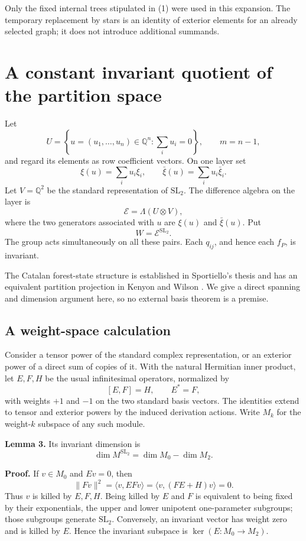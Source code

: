 \documentclass[11pt]{article}
\providecommand{\textquotesingle}{'}
\begin{document}
Only the fixed internal trees stipulated in (1) were used in this expansion. The temporary replacement by stars is an identity of exterior elements for an already selected graph; it does not introduce additional summands.

\section{A constant invariant quotient of the partition space}\label{a-constant-invariant-quotient-of-the-partition-space}

Let \[
U=\left\{u=(u_1,\ldots,u_n)\in\mathbb Q^n:
                  \sum_i u_i=0\right\},\qquad m=n-1,
\] and regard its elements as row coefficient vectors. On one layer set \[
\xi(u)=\sum_i u_i\xi_i,\qquad
\bar\xi(u)=\sum_i u_i\bar\xi_i.
\] Let \(V=\mathbb Q^2\) be the standard representation of \(\mathrm{SL}_2\). The difference algebra on the layer is \[
\mathcal E=\Lambda(U\otimes V),
\] where the two generators associated with \(u\) are \(\xi(u)\) and \(\bar\xi(u)\). Put \[
W=\mathcal E^{\mathrm{SL}_2}.
\tag{8}
\] The group acts simultaneously on all these pairs. Each \(q_{ij}\), and hence each \(f_P\), is invariant.

The Catalan forest-state structure is established in Sportiello\textquotesingle s thesis \cite[Chapter 10]{Sportiello} and has an equivalent partition projection in Kenyon and Wilson \cite[Section 1.2 and Sections 2.1--2.3]{KW}. We give a direct spanning and dimension argument here, so no external basis theorem is a premise.

\subsection{A weight-space calculation}\label{a-weight-space-calculation}

Consider a tensor power of the standard complex representation, or an exterior power of a direct sum of copies of it. With the natural Hermitian inner product, let \(E,F,H\) be the usual infinitesimal operators, normalized by \[
[E,F]=H,\qquad E^*=F,
\] with weights \(+1\) and \(-1\) on the two standard basis vectors. The identities extend to tensor and exterior powers by the induced derivation actions. Write \(M_k\) for the weight-\(k\) subspace of any such module.

\textbf{Lemma 3.} Its invariant dimension is \[
\dim M^{\mathrm{SL}_2}=\dim M_0-\dim M_2.
\tag{9}
\]

\textbf{Proof.} If \(v\in M_0\) and \(Ev=0\), then \[
\|Fv\|^2=\langle v,EFv\rangle
=\langle v,(FE+H)v\rangle=0.
\] Thus \(v\) is killed by \(E,F,H\). Being killed by \(E\) and \(F\) is equivalent to being fixed by their exponentials, the upper and lower unipotent one-parameter subgroups; those subgroups generate \(\mathrm{SL}_2\). Conversely, an invariant vector has weight zero and is killed by \(E\). Hence the invariant subspace is \(\ker(E:M_0\to M_2)\).
\end{document}
